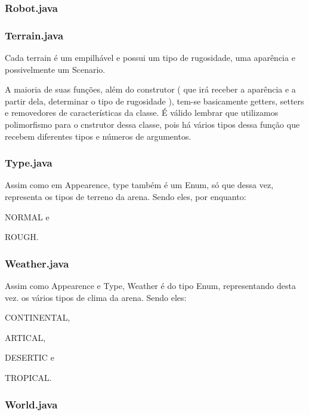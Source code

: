 \documentclass[a4paper]{article}
\begin{document}
{{{{{{{{{{{{		\subsubsection{ Robot.java }
		
		\subsubsection{ Terrain.java }
		    Cada terrain é um empilhável e possui um tipo de 
		    rugosidade, uma aparência e possivelmente um
		    Scenario.
		    
		    A maioria de suas funções, além do construtor ( que
		    irá receber a aparência e a partir dela, determinar 
		    o tipo de rugosidade ), tem-se basicamente getters,
		    setters e removedores de características da classe.
		    É válido lembrar que utilizamos polimorfismo para o
		    cnstrutor dessa classe, pois há vários tipos dessa
		    função que recebem diferentes tipos e números de
		    argumentos.
		    
		
		\subsubsection{ Type.java }
		    Assim como em Appearence, type também é um Enum, só
		    que dessa vez, representa os tipos de terreno da
		    arena. Sendo eles, por enquanto:
		    {\textcolor{NavyBlue}{NORMAL} e 
            {\textcolor{NavyBlue}{ROUGH}.
		
		\subsubsection{ Weather.java }						
		    Assim como Appearence e Type, Weather é do tipo Enum,
		    representando desta vez. os vários tipos de clima da
		    arena. Sendo eles:
		    
		    {\textcolor{NavyBlue}{CONTINENTAL},
            {\textcolor{NavyBlue}{ARTICAL},
            {\textcolor{NavyBlue}{DESERTIC} e
            {\textcolor{NavyBlue}{TROPICAL}.
		
		\subsubsection{ World.java }				
		
		
\newpage %
		
}}}}}}}}}}}}}}}}}}
\end{document}
